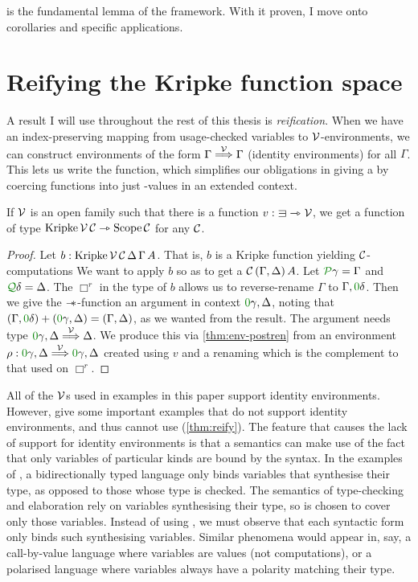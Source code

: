  is the fundamental lemma of the framework.
With it proven, I move onto corollaries and specific applications.

\section{Reifying the Kripke function space}

A result I will use throughout the rest of this thesis is \emph{reification}.
When we have an index-preserving mapping from usage-checked variables to
$\V$-environments, we can construct environments of the form
$\Gamma \stackrel{\mathcal V}\Longrightarrow \Gamma$ (identity environments) for all $\Gamma$.
This lets us write the  function, which  simplifies our
obligations in giving a  by coercing
 functions into just
\AgdaBound{$\C$}-values in an extended context.

\begin{lemma}\label{thm:reify}
  If $\V$ is an open family such that there is a function
  $v : {\sqni} \rightarrowtriangle \V$, we get a function of type
  $\mathrm{Kripke}\,\mathcal V\,\mathcal C \rightarrowtriangle \mathrm{Scope}\,\mathcal C$ for any $\C$.
\end{lemma}
\begin{proof}
  Let $b : \mathrm{Kripke}\,\mathcal V\,\mathcal C\,\Delta\,\Gamma\,A$.
  That is, $b$ is a Kripke function yielding $\C$-computations
  We want to apply $b$ so as to get a $\C\,\plr{\Gamma, \Delta}\,A$.
  Let $\grP\gamma = \Gamma$ and $\grQ\delta = \Delta$.
  The $\Box^r$ in the type of $b$ allows us to reverse-rename $\Gamma$ to
  $\Gamma, \gr0\delta$.
  Then we give the $\mathrel{\mathord{-}\hspace{-0.75ex}*}$-function an argument in context
  $\gr0\gamma, \Delta$, noting that
  $\plr{\Gamma, \gr0\delta} + \plr{\gr0\gamma, \Delta} = \plr{\Gamma, \Delta}$,
  as we wanted from the result.
  The argument needs type $\gr0\gamma, \Delta \env\V \Delta$.
  We produce this via \cref{thm:env-postren} from an environment
  $\rho : \gr0\gamma, \Delta \env\V \gr0\gamma, \Delta$ created using $v$
  and a renaming which is the complement to that used on $\Box^r$.
\end{proof}

All of the $\V$s used in examples in this paper support identity environments.
However, \citet[p.~27]{AACMM21} give some important examples that do not
support identity environments, and thus cannot use 
(\cref{thm:reify}).
The feature that causes the lack of support for identity environments is that
a semantics can make use of the fact that only variables of particular kinds
are bound by the syntax.
In the examples of \citeauthor{AACMM21}, a bidirectionally typed language only
binds variables that synthesise their type, as opposed to those whose type is
checked.
The semantics of type-checking and elaboration rely on variables synthesising
their type, so \AgdaBound{$\V$} is chosen to cover only those variables.
Instead of using , we must observe that each syntactic form
only binds such synthesising variables.
Similar phenomena would appear in, say, a call-by-value language where
variables are values (not computations), or a polarised language where
variables always have a polarity matching their type.

